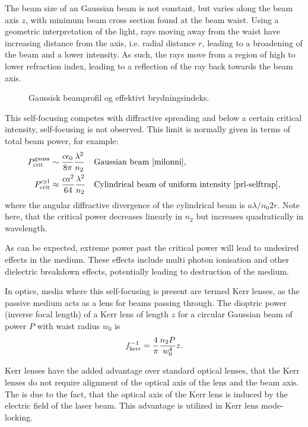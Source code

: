 The beam size of an Gaussian beam is not constant, but varies along
the beam axis $z$, with minimum beam cross section found at the beam
waist. Using a geometric interpretation of the light, rays moving away
from the waist have increasing distance from the axis, i.e. radial
distance $r$, leading to a broadening of the beam and a lower
intensity. As such, the rays move from a region of high to lower
refraction index, leading to a reflection of the ray back towards the
beam axis.

\begin{figure}[t!]
  \centering
  \caption{Gaussisk beamprofil og effektivt brydningsindeks.}
  \label{fig:kerr-refrac}
\end{figure}

This self-focusing competes with diffractive spreading and below a
certain critical intensity, self-focusing is not observed. This limit
is normally given in terms of total beam power, for example:
\begin{align}
  \label{eq:1}
  P_{\textup{crit}}^{\textup{gauss}}
  &\sim \frac{c \epsilon_0}{8 \pi} \frac{\lambda^2}{n_2}
  &&\text{Gaussian beam \cite{milonni}},
  \\
  P_{\textup{crit}}^{\textup{cyl}}
  &\approx \frac{c a^2}{64} \frac{\lambda^2}{n_2}
  &&\text{Cylindrical beam of uniform intensity \cite{prl-selftrap}},
\end{align}
where the angular diffractive divergence of the cylindrical beam is $a
\lambda / n_0 2 r$. Note here, that the critical power decreases
linearly in $n_2$ but increases quadratically in wavelength.

As can be expected, extreme power past the critical power will lead to
undesired effects in the medium. These effects include multi photon
ionisation and other dielectric breakdown effects, potentially leading
to destruction of the medium.

In optics, media where this self-focusing is present are termed Kerr
lenses, as the passive medium acts as a lens for beams passing
through. The dioptric power (inverse focal length) of a Kerr lens of
length $z$ for a circular Gaussian beam of power $P$ with waist radius
$w_0$ is
\cite{yefet-kerrlens}
\begin{align}
  \label{eq:kerr-focal-length}
  f_{\textup{kerr}}^{-1} = \frac{4}{\pi} \frac{n_2 P}{w_0^4} z.
\end{align}

Kerr lenses have the added advantage over standard optical lenses,
that the Kerr lenses do not require alignment of the optical axis of
the lens and the beam axis. The is due to the fact, that the optical
axis of the Kerr lens is induced by the electric field of the laser
beam. This advantage is utilized in Kerr lens mode-locking.




